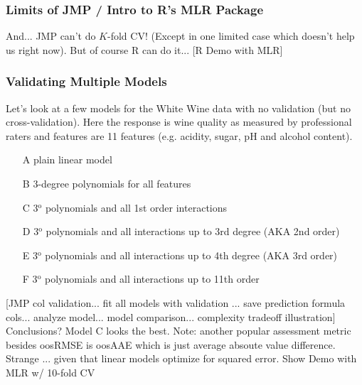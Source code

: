 \documentclass[handout]{beamer}
\begin{document}
\begin{frame}\frametitle{Limits of JMP / Intro to R's MLR Package}

And... \pause JMP can't do $K$-fold CV! (Except in one limited case which doesn't help us right now). But of course R can do it... [R Demo with MLR]
	
\end{frame}


\begin{frame}\frametitle{Validating Multiple Models}
\footnotesize
Let's look at a few models for the White Wine data with no validation (but no cross-validation). Here the response is wine quality as measured by professional raters and features are 11 features (e.g. acidity, sugar, pH and alcohol content).

\vspace{-0.1cm}
\begin{enumerate}\footnotesize
\item[A] plain linear model \pause
\item[B] 3-degree polynomials for all features \pause
\item[C] 3$^{\text{o}}$ polynomials and all 1st order interactions  \pause
\item[D] 3$^{\text{o}}$ polynomials and all interactions up to 3rd degree (AKA 2nd order) \pause
\item[E] 3$^{\text{o}}$ polynomials and all interactions up to 4th degree (AKA 3rd order) \pause
\item[F] 3$^{\text{o}}$ polynomials and all interactions up to 11th order \pause
\end{enumerate}
\footnotesize
\vspace{-0.1cm}
[JMP col validation... fit all models with validation ... save prediction formula cols... analyze model... model comparison... \pause complexity tradeoff illustration] \pause Conclusions? \pause Model C looks the best. \pause Note: another popular assessment metric besides oosRMSE is oosAAE which is just average absoute value difference. Strange ... given that linear models optimize for squared error. \pause 
Show Demo with MLR w/ 10-fold CV \pause {} 
	
\end{frame}
\end{document}
